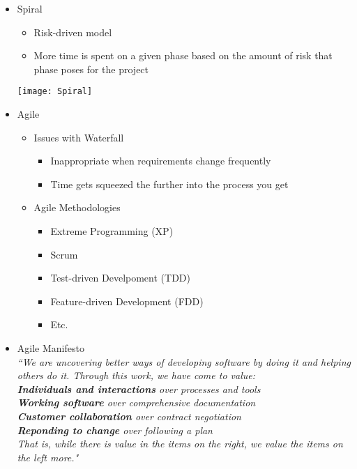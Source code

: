 \documentclass[11pt]{article}
\begin{document}
\begin{itemize}
		\item Spiral\\
			\begin{minipage}{0.7\textwidth}
				\begin{itemize}
					\item Risk-driven model
					\item More time is spent on a given phase based on the amount of risk that phase poses for the project
				\end{itemize}
			\end{minipage}
			\begin{minipage}{0.3\textwidth}
				\texttt{[image: Spiral]}
			\end{minipage}

		\item Agile
			\begin{itemize}
				\item Issues with Waterfall
					\begin{itemize}
						\item Inappropriate when requirements change frequently
						\item Time gets squeezed the further into the process you get
					\end{itemize}
				\item Agile Methodologies
					\begin{itemize}
						\item Extreme Programming (XP)
						\item Scrum
						\item Test-driven Develpoment (TDD)
						\item Feature-driven Development (FDD)
						\item Etc.
					\end{itemize}
			\end{itemize}

		\item Agile Manifesto\\
			\emph{``We are uncovering better ways of developing software by doing it and helping others do it. Through this work, we have come to value:\\
				\hspace*{10mm} \textbf{Individuals and interactions} over processes and tools\\
				\hspace*{10mm} \textbf{Working software} over comprehensive documentation\\
				\hspace*{10mm} \textbf{Customer collaboration} over contract negotiation\\
				\hspace*{10mm} \textbf{Reponding to change} over following a plan\\
			That is, while there is value in the items on the right, we value the items on the left more."}


\end{itemize}
\end{document}
